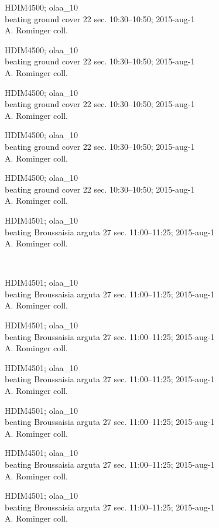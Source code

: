 \documentclass[2pt]{extarticle}
\begin{document}
\noindent
\parbox{0.16\textwidth}{\tiny \raggedright \rule[-0.3\baselineskip]{0pt}{10pt}HDIM4500; olaa\_10\\ beating ground cover 22 sec. 10:30--10:50; 2015-aug-1\\ A. Rominger coll.}
\parbox{0.16\textwidth}{\tiny \raggedright \rule[-0.3\baselineskip]{0pt}{10pt}HDIM4500; olaa\_10\\ beating ground cover 22 sec. 10:30--10:50; 2015-aug-1\\ A. Rominger coll.}
\parbox{0.16\textwidth}{\tiny \raggedright \rule[-0.3\baselineskip]{0pt}{10pt}HDIM4500; olaa\_10\\ beating ground cover 22 sec. 10:30--10:50; 2015-aug-1\\ A. Rominger coll.}
\parbox{0.16\textwidth}{\tiny \raggedright \rule[-0.3\baselineskip]{0pt}{10pt}HDIM4500; olaa\_10\\ beating ground cover 22 sec. 10:30--10:50; 2015-aug-1\\ A. Rominger coll.}
\parbox{0.16\textwidth}{\tiny \raggedright \rule[-0.3\baselineskip]{0pt}{10pt}HDIM4500; olaa\_10\\ beating ground cover 22 sec. 10:30--10:50; 2015-aug-1\\ A. Rominger coll.}
\parbox{0.16\textwidth}{\tiny \raggedright \rule[-0.3\baselineskip]{0pt}{10pt}HDIM4501; olaa\_10\\ beating Broussaisia arguta 27 sec. 11:00--11:25; 2015-aug-1\\ A. Rominger coll.} \\ 
\vspace{0.001in} 

\noindent
\parbox{0.16\textwidth}{\tiny \raggedright \rule[-0.3\baselineskip]{0pt}{10pt}HDIM4501; olaa\_10\\ beating Broussaisia arguta 27 sec. 11:00--11:25; 2015-aug-1\\ A. Rominger coll.}
\parbox{0.16\textwidth}{\tiny \raggedright \rule[-0.3\baselineskip]{0pt}{10pt}HDIM4501; olaa\_10\\ beating Broussaisia arguta 27 sec. 11:00--11:25; 2015-aug-1\\ A. Rominger coll.}
\parbox{0.16\textwidth}{\tiny \raggedright \rule[-0.3\baselineskip]{0pt}{10pt}HDIM4501; olaa\_10\\ beating Broussaisia arguta 27 sec. 11:00--11:25; 2015-aug-1\\ A. Rominger coll.}
\parbox{0.16\textwidth}{\tiny \raggedright \rule[-0.3\baselineskip]{0pt}{10pt}HDIM4501; olaa\_10\\ beating Broussaisia arguta 27 sec. 11:00--11:25; 2015-aug-1\\ A. Rominger coll.}
\parbox{0.16\textwidth}{\tiny \raggedright \rule[-0.3\baselineskip]{0pt}{10pt}HDIM4501; olaa\_10\\ beating Broussaisia arguta 27 sec. 11:00--11:25; 2015-aug-1\\ A. Rominger coll.}
\parbox{0.16\textwidth}{\tiny \raggedright \rule[-0.3\baselineskip]{0pt}{10pt}HDIM4501; olaa\_10\\ beating Broussaisia arguta 27 sec. 11:00--11:25; 2015-aug-1\\ A. Rominger coll.} \\ 
\vspace{0.001in} 
\end{document}
